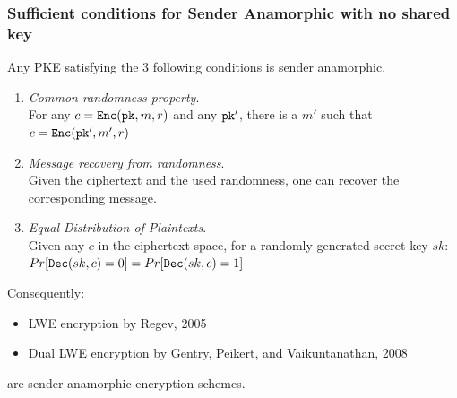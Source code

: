 \documentclass[handout]{beamer}
\begin{document}
\begin{frame}
\frametitle{Sufficient conditions for Sender Anamorphic with no shared key}
Any PKE satisfying the 3 following conditions is sender anamorphic. 
\begin{enumerate}
\item {\em \color{brown} Common randomness property}.\\
For any $ c= \mathtt{Enc}({\mathtt{pk}},m,r)$ and any $\mathtt{pk}'$, there is a $m'$ such that $ c= \mathtt{Enc}({\mathtt{pk}'},m',r)$ 
\item {\em\color{brown} Message recovery from randomness}.\\
Given the ciphertext and the used randomness, one can recover the corresponding message.  
\item {\em\color{brown} Equal Distribution of Plaintexts}.\\
Given any $c$ in the ciphertext space, for a randomly generated secret key $sk$: $Pr[\mathtt{Dec}(sk,c)=0] = Pr[\mathtt{Dec}(sk,c)=1]$
\end{enumerate}

\pause

Consequently: 
\begin{itemize}
    \item {\color{purple}LWE encryption} by Regev, 2005
    \item {\color{purple} Dual LWE encryption} by Gentry, Peikert, and Vaikuntanathan, 2008
\end{itemize}
are sender anamorphic encryption schemes. 
\end{frame}
\end{document}
